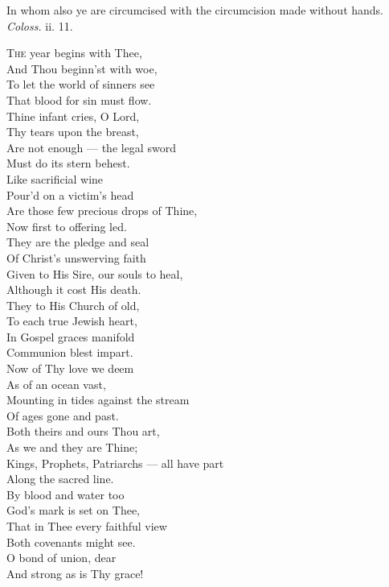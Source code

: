 In whom also ye are circumcised with the circumcision made without hands. \emph{Coloss.} ii. 11.

\textsc{The} year begins with Thee, \\
 And Thou beginn’st with woe, \\
 To let the world of sinners see \\
 That blood for sin must flow. \\
  Thine infant cries, O Lord, \\
 Thy tears upon the breast, \\
 Are not enough — the legal sword \\
 Must do its stern behest. \\
  Like sacrificial wine \\
 Pour’d on a victim’s head \\
 Are those few precious drops of Thine, \\
 Now first to offering led. \\
  They are the pledge and seal \\
 Of Christ’s unswerving faith \\
 Given to His Sire, our souls to heal, \\
 Although it cost His death. \\
  They to His Church of old, \\
 To each true Jewish heart, \\
 In Gospel graces manifold \\
 Communion blest impart. \\
  Now of Thy love we deem \\
 As of an ocean vast, \\
 Mounting in tides against the stream \\
 Of ages gone and past. \\
  Both theirs and ours Thou art, \\
 As we and they are Thine; \\
 Kings, Prophets, Patriarchs — all have part \\
 Along the sacred line. \\
  By blood and water too \\
 God’s mark is set on Thee, \\
 That in Thee every faithful view \\
 Both covenants might see. \\
  O bond of union, dear \\
 And strong as is Thy grace! \\
